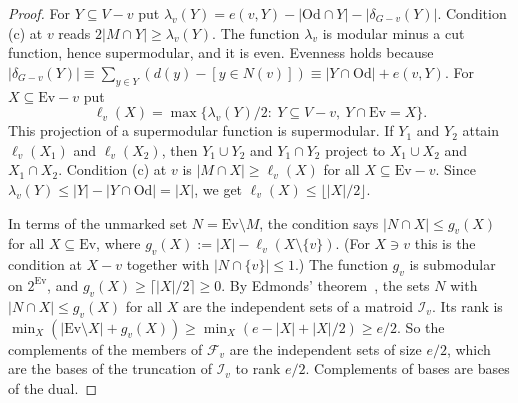 \documentclass[11pt]{amsart}
\theoremstyle{definition}
\newcommand{\Ev}{\mathrm{Ev}}
\newcommand{\Od}{\mathrm{Od}}
\newcommand{\cF}{\mathcal F}
\begin{document}
\begin{proof}
For $Y\subseteq V-v$ put $\lambda_v(Y)=e(v,Y)-|\Od\cap Y|-|\delta_{G-v}(Y)|$. Condition (c) at $v$
reads $2|M\cap Y|\ge\lambda_v(Y)$. The function $\lambda_v$ is modular minus a cut function, hence
supermodular, and it is even. Evenness holds because
$|\delta_{G-v}(Y)|\equiv\sum_{y\in Y}(d(y)-[y\in N(v)])\equiv|Y\cap\Od|+e(v,Y)$. For
$X\subseteq\Ev-v$ put
\[
\ell_v(X)=\max\{\lambda_v(Y)/2:\ Y\subseteq V-v,\ Y\cap\Ev=X\}.
\]
This projection of a supermodular function is supermodular. If $Y_1$ and $Y_2$ attain $\ell_v(X_1)$
and $\ell_v(X_2)$, then $Y_1\cup Y_2$ and $Y_1\cap Y_2$ project to $X_1\cup X_2$ and $X_1\cap X_2$.
Condition (c) at $v$ is $|M\cap X|\ge\ell_v(X)$ for all $X\subseteq\Ev-v$. Since
$\lambda_v(Y)\le|Y|-|Y\cap\Od|=|X|$, we get $\ell_v(X)\le\lfloor |X|/2\rfloor$.

In terms of the unmarked set $N=\Ev\setminus M$, the condition says $|N\cap X|\le g_v(X)$ for all
$X\subseteq\Ev$, where $g_v(X):=|X|-\ell_v(X\setminus\{v\})$. (For $X\ni v$ this is the condition at
$X-v$ together with $|N\cap\{v\}|\le1$.) The function $g_v$ is submodular on $2^{\Ev}$, and
$g_v(X)\ge\lceil |X|/2\rceil\ge 0$. By Edmonds' theorem~\cite{Edm70}, the sets $N$ with
$|N\cap X|\le g_v(X)$ for all $X$ are the independent sets of a matroid $\mathcal I_v$. Its rank is
$\min_X(|\Ev\setminus X|+g_v(X))\ge\min_X(e-|X|+|X|/2)\ge e/2$. So the complements of the members of
$\cF_v$ are the independent sets of size $e/2$, which are the bases of the truncation of
$\mathcal I_v$ to rank $e/2$. Complements of bases are bases of the dual.
\end{proof}
\end{document}
